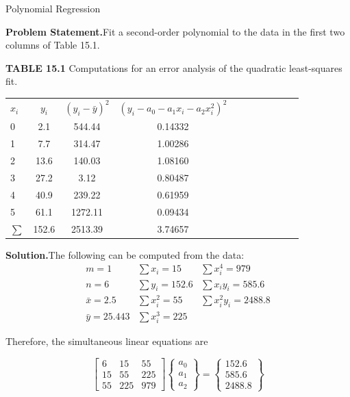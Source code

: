 \documentclass[../main.tex]{subfiles}
\begin{document}
\begin{example} Polynomial Regression

    \textbf{Problem Statement.}\quad Fit a second-order polynomial to the data in the first two columns
	of Table 15.1.

	\textbf{TABLE 15.1} \quad Computations for an error analysis of the quadratic least-squares fit.

	\begin{tabular}{l c c c c c c c c c c}
		$x_i$ & $y_i$ & $(y_i - \bar{y})^2$ & $(y_i - a_0 - a_1 x_i - a_2 x_i^2 )^2$ \\
		0 &  2.1 &  544.44 &  0.14332 \\
		1 &	 7.7 &  314.47 &  1.00286 \\
		2 &  13.6 &  140.03 &  1.08160 \\
		3 &  27.2 &  3.12 &  0.80487 \\
		4 &  40.9 &  239.22 &  0.61959 \\
		5 &  61.1 &  1272.11 &  0.09434 \\
		$\sum$ & 152.6 &  2513.39 &  3.74657
  	\end{tabular}

	\noindent\textbf{Solution.}\quad The following can be computed from the data:
$$
	\begin{matrix}
		m = 1 & \sum x_i = 15 & \sum x^4_i = 979 \\
		n= 6 & \sum y_i = 152.6 & \sum x_i y_i = 585.6 \\
		\bar{x} = 2.5 & \sum x^2_i = 55 & \sum x^2_i y_i = 2488.8 \\
		\bar{y} = 25.443 & \sum x^3_i = 225
	\end{matrix}
$$

	\noindent Therefore, the simultaneous linear equations are

	$$
		\begin{bmatrix}
			6 & 15 & 55 \\
			15 & 55 & 225 \\
			55 & 225 & 979
		\end{bmatrix}
		\begin{Bmatrix}
			a_0 \\ a_1 \\ a_2
		\end{Bmatrix}
		=
		\begin{Bmatrix}
			152.6 \\
			585.6 \\
			2488.8
		\end{Bmatrix}
	$$


\end{example}
\end{document}
